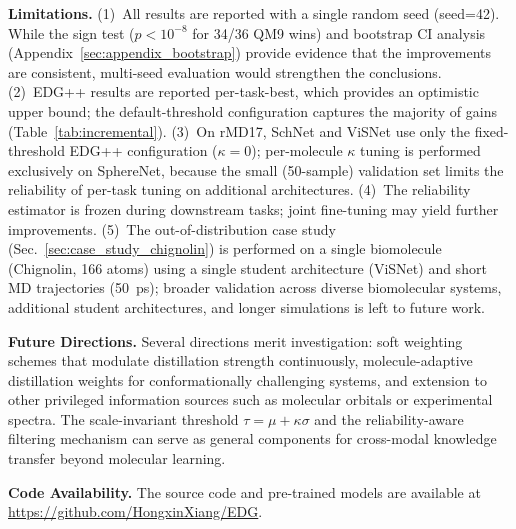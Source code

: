 \textbf{Limitations.} (1)~All results are reported with a single random seed (seed=42). While the sign test ($p < 10^{-8}$ for 34/36 QM9 wins) and bootstrap CI analysis (Appendix~\ref{sec:appendix_bootstrap}) provide evidence that the improvements are consistent, multi-seed evaluation would strengthen the conclusions. (2)~EDG++ results are reported per-task-best, which provides an optimistic upper bound; the default-threshold configuration captures the majority of gains (Table~\ref{tab:incremental}). %
(3)~On rMD17, SchNet and ViSNet use only the fixed-threshold EDG++ configuration ($\kappa\!=\!0$); per-molecule $\kappa$ tuning is performed exclusively on SphereNet, because the small (50-sample) validation set limits the reliability of per-task tuning on additional architectures. (4)~The reliability estimator is frozen during downstream tasks; joint fine-tuning may yield further improvements. (5)~The out-of-distribution case study (Sec.~\ref{sec:case_study_chignolin}) is performed on a single biomolecule (Chignolin, 166 atoms) using a single student architecture (ViSNet) and short MD trajectories (\SI{50}{\pico\second}); broader validation across diverse biomolecular systems, additional student architectures, and longer simulations is left to future work.

\textbf{Future Directions.} Several directions merit investigation: soft weighting schemes that modulate distillation strength continuously, molecule-adaptive distillation weights for conformationally challenging systems, and extension to other privileged information sources such as molecular orbitals or experimental spectra. The scale-invariant threshold $\tau = \mu + \kappa\sigma$ and the reliability-aware filtering mechanism can serve as general components for cross-modal knowledge transfer beyond molecular learning.

\textbf{Code Availability.} The source code and pre-trained models are available at \url{https://github.com/HongxinXiang/EDG}.
